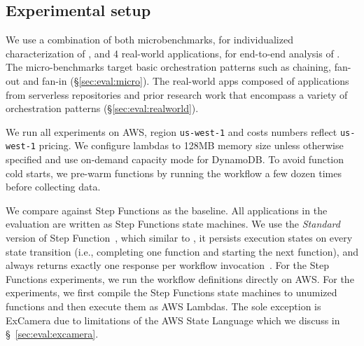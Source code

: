 	
	
	

\subsection{Experimental setup}

We use a combination of both microbenchmarks, for individualized characterization of \name{}, and 4 real-world applications, for end-to-end analysis of \name{}. The micro-benchmarks target basic orchestration patterns such as
chaining, fan-out and fan-in
(\S\ref{sec:eval:micro}). The real-world apps composed of applications from serverless repositories and
prior research work  that encompass a variety of orchestration patterns (\S\ref{sec:eval:realworld}).

We run all experiments on AWS, region \texttt{us-west-1} and costs numbers
reflect \texttt{us-west-1} pricing. We configure lambdas to 128MB memory size
unless otherwise specified and use on-demand capacity mode for DynamoDB. To
avoid function cold starts, we pre-warm functions by running the workflow a
few dozen times before collecting data.


We compare against Step Functions as the baseline. All applications in the
evaluation are written as Step Functions state machines. 
We use the \emph{Standard}
version of Step Function~\cite{aws-step-functions-standard-vs-express}, which similar to \name{}, it persists execution states on every state transition (i.e.,
completing one function and starting the next function), and always returns
exactly one response per workflow
invocation~\cite{aws-step-functions-exec-gntee}.
For the Step
Functions experiments, we run the workflow definitions directly on AWS. For
the \name{} experiments, we first compile the Step Functions state machines to
unumized functions and then execute them as AWS Lambdas. The sole exception is
ExCamera due to limitations of the AWS State Language which we discuss in
\S~\ref{sec:eval:excamera}.


